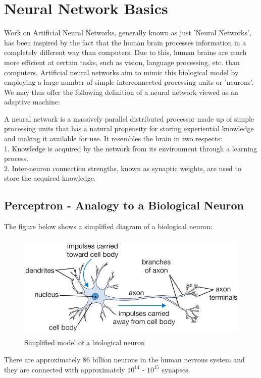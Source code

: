 \documentclass[twoside]{article}
\begin{document}
\section{Neural Network Basics}
Work on Artificial Neural Networks, generally known as just 'Neural Networks', has been inspired by the fact that the human brain processes information in a completely different way than computers. Due to this, human brains are much more efficient at certain tasks, such as vision, language processing, etc. than computers. Artificial neural networks aim to mimic this biological model by employing a large number of simple interconnected processing units or 'neurons'.  We may thus offer the following definition of a neural network viewed as an adaptive machine\cite{haykin}:

A neural network is a massively parallel distributed processor made up of simple processing units that has a natural propensity for storing experiential knowledge and making it available for use. It resembles the brain in two respects:\\
1. Knowledge is acquired by the network from its environment through a learning process.\\
2. Inter-neuron connection strengths, known as synaptic weights, are used to store the acquired knowledge.

\subsection{Perceptron - Analogy to a Biological Neuron}
The figure below shows a simplified diagram of a biological neuron:

\begin{figure}[!htb]
\centering
\includegraphics[height = 2in]{pics/neuron.png}
\caption{Simplified model of a biological neuron\cite{cs231n-website}}
\label{fig:bio-neuron}
\end{figure}

There are approximately 86 billion neurons in the human nervous system and they are connected with approximately $10^14$ - $10^15$ synapses\cite{cs231n-website}.
\end{document}
